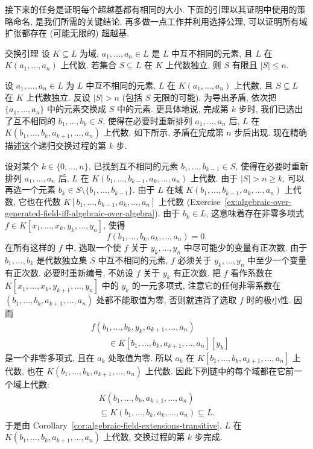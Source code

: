 \BookPairedNoteLeft
  {接下来的任务是证明每个超越基都有相同的大小. 下面的引理以其证明中使用的策略命名, 是我们所需的关键结论.}
  {再多做一点工作并利用选择公理, 可以证明所有域扩张都存在 (可能无限的) 超越基.}

\begin{Lemma}{交换引理}\leavevmode\label{lem:transcendence-basis-exchange}
设 $K\subseteq L$ 为域, $a_{1},\ldots,a_{n}\in L$ 是 $L$ 中互不相同的元素, 且 $L$ 在 $K(a_{1},\ldots,a_{n})$ 上代数. 若集合 $S\subseteq L$ 在 $K$ 上代数独立, 则 $S$ 有限且 $|S|\leq n$.
\end{Lemma}
\begin{Proof}
设 $a_{1},\ldots,a_{n}\in L$ 为 $L$ 中互不相同的元素, $L$ 在 $K(a_{1},\ldots,a_{n})$ 上代数, 且 $S\subseteq L$ 在 $K$ 上代数独立. 反设 $|S|>n$ (包括 $S$ 无限的可能). 为导出矛盾, 依次把 $\{a_{1},\ldots,a_{n}\}$ 中的元素\textquotedbl{}交换\textquotedbl{}成 $S$ 中的元素. 更具体地说, 完成第 $k$ 步时, 我们已选出了互不相同的 $b_{1},\ldots,b_{k}\in S$, 使得在必要时重新排列 $a_{1},\ldots,a_{n}$ 后, $L$ 在 $K(b_{1},\ldots,b_{k},a_{k+1},\ldots,a_{n})$ 上代数. 如下所示, 矛盾在完成第 $n$ 步后出现. 现在精确描述这个递归交换过程的第 $k$ 步.

设对某个 $k\in\{0,\ldots,n\}$, 已找到互不相同的元素 $b_{1},\ldots,b_{k-1}\in S$, 使得在必要时重新排列 $a_{1},\ldots,a_{n}$ 后, $L$ 在 $K(b_{1},\ldots,b_{k-1},a_{k},\ldots,a_{n})$ 上代数. 由于 $|S|>n\geq k$, 可以再选一个元素 $b_{k}\in S\setminus\{b_{1},\ldots,b_{k-1}\}$. 由于 $L$ 在域 $K(b_{1},\ldots,b_{k-1},a_{k},\ldots,a_{n})$ 上代数, 它也在代数 $K[b_{1},\ldots,b_{k-1},a_{k},\ldots,a_{n}]$ 上代数 (Exercise~\ref{ex:algebraic-over-generated-field-iff-algebraic-over-algebra}). 由于 $b_{k}\in L$, 这意味着存在非零多项式 $f\in K[x_{1},\ldots,x_{k},y_{k},\ldots,y_{n}]$, 使得
\[
  f(b_{1},\ldots,b_{k},a_{k},\ldots,a_{n})=0.
\]
在所有这样的 $f$ 中, 选取一个使 $f$ 关于 $y_{k},\ldots,y_{n}$ 中尽可能少的变量有正次数. 由于 $b_{1},\ldots,b_{k}$ 是代数独立集 $S$ 中互不相同的元素, $f$ 必须关于 $y_{k},\ldots,y_{n}$ 中至少一个变量有正次数. 必要时重新编号, 不妨设 $f$ 关于 $y_{k}$ 有正次数. 把 $f$ 看作系数在 $K[x_{1},\ldots,x_{k},y_{k+1},\ldots,y_{n}]$ 中的 $y_{k}$ 的一元多项式, 注意它的任何非零系数在 $(b_{1},\ldots,b_{k},a_{k+1},\ldots,a_{n})$ 处都不能取值为零, 否则就违背了选取 $f$ 时的极小性. 因而
\[
  \begin{aligned}
    &f(b_{1},\ldots,b_{k},y_{k},a_{k+1},\ldots,a_{n})\\
    &\qquad\in K[b_{1},\ldots,b_{k},a_{k+1},\ldots,a_{n}][y_{k}]
  \end{aligned}
\]
是一个非零多项式, 且在 $a_{k}$ 处取值为零. 所以 $a_{k}$ 在 $K[b_{1},\ldots,b_{k},a_{k+1},\ldots,a_{n}]$ 上代数, 也在 $K(b_{1},\ldots,b_{k},a_{k+1},\ldots,a_{n})$ 上代数. 因此下列链中的每个域都在它前一个域上代数:
\[
  \begin{gathered}
    K(b_{1},\ldots,b_{k},a_{k+1},\ldots,a_{n})\\
    \subseteq K(b_{1},\ldots,b_{k},a_{k},\ldots,a_{n})\subseteq L.
  \end{gathered}
\]
于是由 Corollary~\ref{cor:algebraic-field-extensions-transitive}, $L$ 在 $K(b_{1},\ldots,b_{k},a_{k+1},\ldots,a_{n})$ 上代数, 交换过程的第 $k$ 步完成.


\end{Proof}
